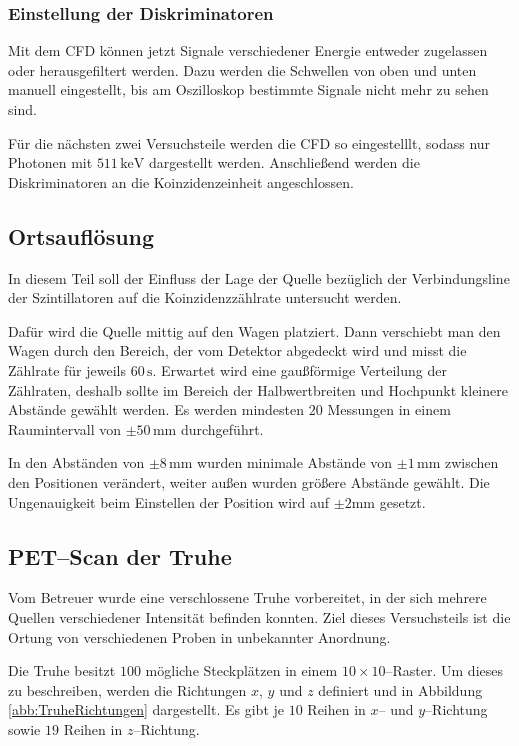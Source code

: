 \documentclass[12pt,a4paper]{scrartcl}
\numberwithin{equation}{section} %
\newcommand{\pu}[1]{\ensuremath{\mathrm{#1}}}
\begin{document}
\subsubsection{Einstellung der Diskriminatoren}
Mit dem CFD können jetzt Signale verschiedener Energie entweder zugelassen oder herausgefiltert werden. Dazu werden die Schwellen von oben und unten manuell eingestellt, bis am Oszilloskop bestimmte Signale nicht mehr zu sehen sind.

Für die nächsten zwei Versuchsteile werden die CFD so eingestelllt, sodass nur Photonen mit $\pu{511\, keV}$ dargestellt werden. Anschließend werden die Diskriminatoren an die Koinzidenzeinheit angeschlossen.

\subsection{Ortsauflösung}
\label{sec:Ortsauflösung}
In diesem Teil soll der Einfluss der Lage der Quelle bezüglich der Verbindungsline der Szintillatoren auf die Koinzidenzzählrate untersucht werden.

Dafür wird die Quelle mittig auf den Wagen platziert. Dann verschiebt man den Wagen durch den Bereich, der vom Detektor abgedeckt wird und misst die Zählrate für jeweils $60\,\mathrm{s}$. Erwartet wird eine gaußförmige Verteilung der Zählraten, deshalb sollte im Bereich der Halbwertbreiten und Hochpunkt kleinere Abstände gewählt werden. Es werden mindesten $20$ Messungen in einem Raumintervall von $\pm 50\,\mathrm{mm}$ durchgeführt.

In den Abständen von $\pm 8\,\mathrm{mm}$ wurden minimale Abstände von $\pm 1\,\mathrm{mm}$ zwischen den Positionen verändert, weiter außen wurden größere Abstände gewählt. Die Ungenauigkeit beim Einstellen der Position wird auf $\pu{\pm 2 mm}$ gesetzt.

\subsection{PET--Scan der Truhe}
Vom Betreuer wurde eine verschlossene Truhe vorbereitet, in der sich mehrere Quellen verschiedener Intensität befinden konnten.  Ziel dieses Versuchsteils ist die Ortung von verschiedenen Proben in unbekannter Anordnung.

Die Truhe besitzt $100$ mögliche Steckplätzen in einem $10\times10$--Raster. Um dieses zu beschreiben, werden die Richtungen $x$, $y$ und $z$ definiert und in Abbildung \ref{abb:TruheRichtungen} dargestellt. Es gibt je $10$ Reihen in $x$-- und $y$--Richtung sowie $19$ Reihen in $z$--Richtung.
\end{document}
